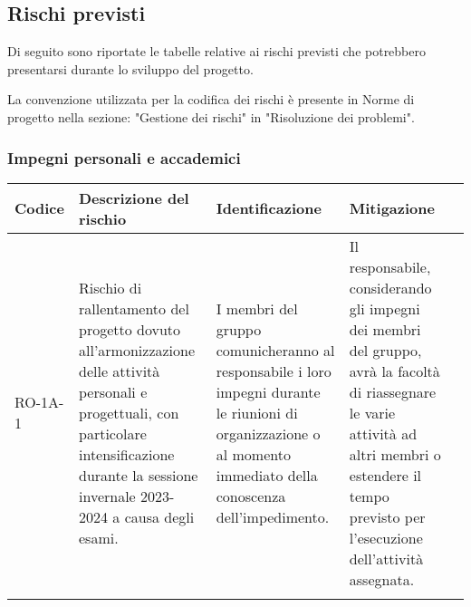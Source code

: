 \subsection{Rischi previsti}
Di seguito sono riportate le tabelle relative ai rischi previsti che potrebbero presentarsi durante lo sviluppo del progetto. 

La convenzione utilizzata per la codifica dei rischi è presente in Norme di progetto nella sezione: "Gestione dei rischi" in "Risoluzione dei problemi". 


\subsubsection{Impegni personali e accademici}\label{sec:ImpPersonali}
\begin{table}[h]
    \centering
    \begin{tabularx}{\textwidth}{l>{\RaggedRight}X>{\RaggedRight}X>{\RaggedRight}X>{\RaggedRight}X}
    \toprule
    \rowcolor{gray!50}
    \textbf{Codice} & \textbf{Descrizione del rischio} & \textbf{Identificazione} & \textbf{Mitigazione} \\
    \midrule
    \addlinespace 
    RO-1A-1 & 
    Rischio di rallentamento del progetto dovuto all'armonizzazione delle attività personali e progettuali, con particolare intensificazione durante la sessione invernale 2023-2024 a causa degli esami. & 
    I membri del gruppo comunicheranno al responsabile i loro impegni durante le riunioni di organizzazione o al momento immediato della conoscenza dell'impedimento.& 
    Il responsabile, considerando gli impegni dei membri del gruppo, avrà la facoltà di riassegnare le varie attività ad altri membri o estendere il tempo previsto per l'esecuzione dell'attività assegnata. \\  
    \bottomrule
    \addlinespace 
    \end{tabularx}
\end{table}

